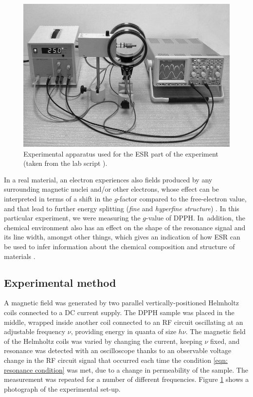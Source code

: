 \documentclass[a4paper]{jpconf}
\numberwithin{equation}{section}
\begin{document}
\begin{figure}[t!]
	\includegraphics[scale=0.4]{apparatus.png}
	\hspace{2pc}
	\begin{minipage}[b]{2in}
		\caption{Experimental apparatus used for the ESR part of the experiment (taken from the lab script \cite{MacLaren}).}
		\label{fig: apparatus}
	\end{minipage}
\end{figure}

In a real material, an electron experiences also fields produced by any surrounding magnetic nuclei and/or other electrons, whose effect can be interpreted in terms of a shift in the $g$-factor compared to the free-electron value, and that lead to further energy splitting (\emph{fine} and \emph{hyperfine structure}) \cite{Lancaster, Ball}. In this particular experiment, we were measuring the $g$-value of DPPH. In~addition, the chemical environment also has an effect on the shape of the resonance signal and its line width, amongst other things, which gives an indication of how ESR can be used to infer information about the chemical composition and structure of materials \cite{Lancaster}. 

\subsection{Experimental method}\label{section: method}
A magnetic field was generated by two parallel vertically-positioned Helmholtz coils connected to a DC current supply. The DPPH sample was placed in the middle, wrapped inside another coil connected to an RF circuit oscillating at an adjustable frequency $\nu$, providing energy in quanta of size $h\nu$. The magnetic field of the Helmholtz coils was varied by changing the current, keeping $\nu$ fixed, and resonance was detected with an oscilloscope thanks to an observable voltage change in the RF circuit signal that occurred each time the condition \eqref{eqn: resonance condition} was met, due to a change in permeability of the sample. The measurement was repeated for a number of different frequencies. Figure \ref{fig: apparatus} shows a photograph of the experimental set-up.
\end{document}
